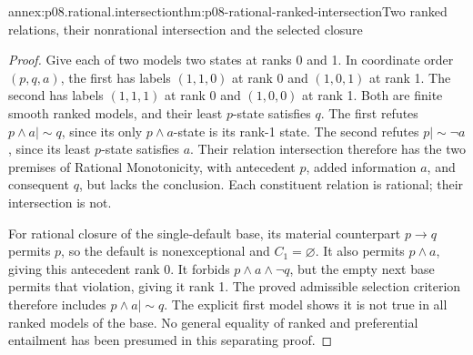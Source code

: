 \begin{annexitem}{annex:p08.rational.intersection}{thm:p08-rational-ranked-intersection}{Two ranked relations, their nonrational intersection and the selected closure}
\begin{proof}
Give each of two models two states at ranks 0 and 1. In coordinate
order \((p,q,a)\), the first has labels \((1,1,0)\) at rank 0
and \((1,0,1)\) at rank 1. The second has labels \((1,1,1)\)
at rank 0 and \((1,0,0)\) at rank 1. Both are finite smooth
ranked models, and their least \(p\)-state satisfies \(q\).
The first refutes \(p\wedge a\mathrel{|\!\sim}q\), since
its only \(p\wedge a\)-state is its rank-1 state.
The second refutes \(p\mathrel{|\!\sim}\neg a\), since
its least \(p\)-state satisfies \(a\).
Their relation intersection therefore has the two premises of Rational
Monotonicity, with antecedent \(p\), added information \(a\),
and consequent \(q\), but lacks the conclusion. Each constituent
relation is rational; their intersection is not.

For rational closure of the single-default base, its material
counterpart \(p\to q\) permits \(p\), so the default is
nonexceptional and \(C_1=\varnothing\). It also permits
\(p\wedge a\), giving this antecedent rank 0. It forbids
\(p\wedge a\wedge\neg q\), but the empty next base permits
that violation, giving it rank 1. The proved admissible selection
criterion therefore includes \(p\wedge a\mathrel{|\!\sim}q\).
The explicit first model shows it is not true in all ranked models
of the base. No general equality of ranked and preferential entailment
has been presumed in this separating proof.
\end{proof}
\end{annexitem}

